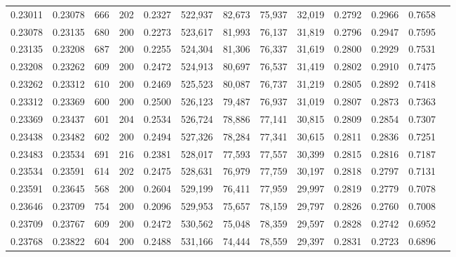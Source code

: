 \begin{tabular}{rrrrrrrrrrrrr}
0.23011 & 0.23078 &   666 & 202 &                                     0.2327 & 522,937 &  82,673 &  75,937 &  32,019 & 0.2792 & 0.2966 & 0.7658 \\
0.23078 & 0.23135 &   680 & 200 &                                     0.2273 & 523,617 &  81,993 &  76,137 &  31,819 & 0.2796 & 0.2947 & 0.7595 \\
0.23135 & 0.23208 &   687 & 200 &                                     0.2255 & 524,304 &  81,306 &  76,337 &  31,619 & 0.2800 & 0.2929 & 0.7531 \\
0.23208 & 0.23262 &   609 & 200 &                                     0.2472 & 524,913 &  80,697 &  76,537 &  31,419 & 0.2802 & 0.2910 & 0.7475 \\
0.23262 & 0.23312 &   610 & 200 &                                     0.2469 & 525,523 &  80,087 &  76,737 &  31,219 & 0.2805 & 0.2892 & 0.7418 \\
0.23312 & 0.23369 &   600 & 200 &                                     0.2500 & 526,123 &  79,487 &  76,937 &  31,019 & 0.2807 & 0.2873 & 0.7363 \\
0.23369 & 0.23437 &   601 & 204 &                                     0.2534 & 526,724 &  78,886 &  77,141 &  30,815 & 0.2809 & 0.2854 & 0.7307 \\
0.23438 & 0.23482 &   602 & 200 &                                     0.2494 & 527,326 &  78,284 &  77,341 &  30,615 & 0.2811 & 0.2836 & 0.7251 \\
0.23483 & 0.23534 &   691 & 216 &                                     0.2381 & 528,017 &  77,593 &  77,557 &  30,399 & 0.2815 & 0.2816 & 0.7187 \\
0.23534 & 0.23591 &   614 & 202 &                                     0.2475 & 528,631 &  76,979 &  77,759 &  30,197 & 0.2818 & 0.2797 & 0.7131 \\
0.23591 & 0.23645 &   568 & 200 &                                     0.2604 & 529,199 &  76,411 &  77,959 &  29,997 & 0.2819 & 0.2779 & 0.7078 \\
0.23646 & 0.23709 &   754 & 200 &                                     0.2096 & 529,953 &  75,657 &  78,159 &  29,797 & 0.2826 & 0.2760 & 0.7008 \\
0.23709 & 0.23767 &   609 & 200 &                                     0.2472 & 530,562 &  75,048 &  78,359 &  29,597 & 0.2828 & 0.2742 & 0.6952 \\
0.23768 & 0.23822 &   604 & 200 &                                     0.2488 & 531,166 &  74,444 &  78,559 &  29,397 & 0.2831 & 0.2723 & 0.6896 \\

\end{tabular}
